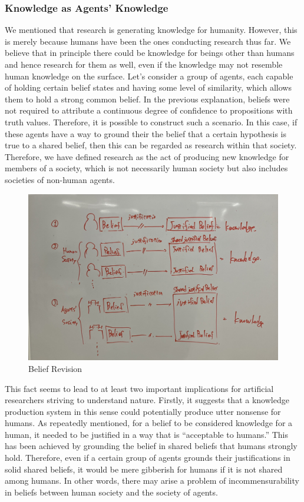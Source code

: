 \subsubsection{Knowledge as Agents' Knowledge}
We mentioned that research is generating knowledge for humanity. However, this is merely because humans have been the ones conducting research thus far. We believe that in principle there could be knowledge for beings other than humans and hence research for them as well, even if the knowledge may not resemble human knowledge on the surface. Let's consider a group of agents, each capable of holding certain belief states and having some level of similarity, which allows them to hold a strong common belief. In the previous explanation, beliefs were not required to attribute a continuous degree of confidence to propositions with truth values. Therefore, it is possible to construct such a scenario. In this case, if these agents have a way to ground their the belief that a certain hypothesis is true to a shared belief, then this can be regarded as research within that society. Therefore, we have defined research as the act of producing new knowledge for members of a society, which is not necessarily human society but also includes societies of non-human agents.

\begin{figure}[htb]
    \centering
    \includegraphics[width=\linewidth]{figs/shared_belief_revision.jpg}
    \caption{Belief Revision}
    \label{fig:definition}
\end{figure}

This fact seems to lead to at least two important implications for artificial researchers striving to understand nature. Firstly, it suggests that a knowledge production system in this sense could potentially produce utter nonsense for humans. As repeatedly mentioned, for a belief to be considered knowledge for a human, it needed to be justified in a way that is ``acceptable to humans.'' This has been achieved by grounding the belief in shared beliefs that humans strongly hold. Therefore, even if a certain group of agents grounds their justifications in solid shared beliefs, it would be mere gibberish for humans if it is not shared among humans. In other words, there may arise a problem of incommensurability \cite{kuhn1962} in beliefs between human society and the society of agents. 

